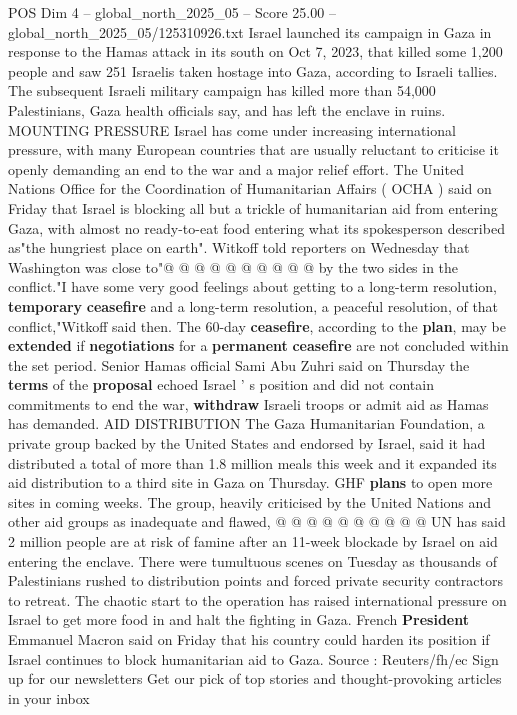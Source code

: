 \begin{textsample}{POS Dim 4 – global\_north\_2025\_05 – Score 25.00 – global\_north\_2025\_05/125310926.txt}
Israel launched its campaign in Gaza in response to the Hamas attack in its south on Oct 7, 2023, that killed some 1,200 people and saw 251 Israelis taken hostage into Gaza, according to Israeli tallies.
The subsequent Israeli military campaign has killed more than 54,000 Palestinians, Gaza health officials say, and has left the enclave in ruins.
MOUNTING PRESSURE Israel has come under increasing international pressure, with many European countries that are usually reluctant to criticise it openly demanding an end to the war and a major relief effort.
The United Nations Office for the Coordination of Humanitarian Affairs ( OCHA ) said on Friday that Israel is blocking all but a trickle of humanitarian aid from entering Gaza, with almost no ready-to-eat food entering what its spokesperson described as"the hungriest place on earth".
Witkoff told reporters on Wednesday that Washington was close to"@ @ @ @ @ @ @ @ @ @ by the two sides in the conflict."I have some very good feelings about getting to a long-term resolution, \textbf{temporary} \textbf{ceasefire} and a long-term resolution, a peaceful resolution, of that conflict,"Witkoff said then.
The 60-day \textbf{ceasefire}, according to the \textbf{plan}, may be \textbf{extended} if \textbf{negotiations} for a \textbf{permanent} \textbf{ceasefire} are not concluded within the set period.
Senior Hamas official Sami Abu Zuhri said on Thursday the \textbf{terms} of the \textbf{proposal} echoed Israel ' s position and did not contain commitments to end the war, \textbf{withdraw} Israeli troops or admit aid as Hamas has demanded.
AID DISTRIBUTION The Gaza Humanitarian Foundation, a private group backed by the United States and endorsed by Israel, said it had distributed a total of more than 1.8 million meals this week and it expanded its aid distribution to a third site in Gaza on Thursday.
GHF \textbf{plans} to open more sites in coming weeks.
The group, heavily criticised by the United Nations and other aid groups as inadequate and flawed, @ @ @ @ @ @ @ @ @ @ UN has said 2 million people are at risk of famine after an 11-week blockade by Israel on aid entering the enclave.
There were tumultuous scenes on Tuesday as thousands of Palestinians rushed to distribution points and forced private security contractors to retreat.
The chaotic start to the operation has raised international pressure on Israel to get more food in and halt the fighting in Gaza.
French \textbf{President} Emmanuel Macron said on Friday that his country could harden its position if Israel continues to block humanitarian aid to Gaza.
Source : Reuters/fh/ec Sign up for our newsletters Get our pick of top stories and thought-provoking articles in your inbox

\end{textsample}
